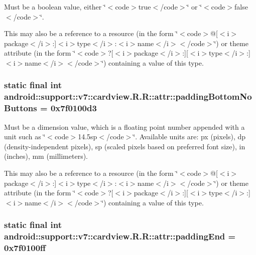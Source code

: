 Must be a boolean value, either \char`\"{}$<$code$>$true$<$/code$>$\char`\"{} or \char`\"{}$<$code$>$false$<$/code$>$\char`\"{}. 

This may also be a reference to a resource (in the form \char`\"{}$<$code$>$@\mbox{[}$<$i$>$package$<$/i$>$:\mbox{]}$<$i$>$type$<$/i$>$:$<$i$>$name$<$/i$>$$<$/code$>$\char`\"{}) or theme attribute (in the form \char`\"{}$<$code$>$?\mbox{[}$<$i$>$package$<$/i$>$:\mbox{]}\mbox{[}$<$i$>$type$<$/i$>$:\mbox{]}$<$i$>$name$<$/i$>$$<$/code$>$\char`\"{}) containing a value of this type. \hypertarget{classandroid_1_1support_1_1v7_1_1cardview_1_1_r_1_1attr_448e41b242eb37c2a11ed6d198179440}{
\subsubsection[{paddingBottomNoButtons}]{\setlength{\rightskip}{0pt plus 5cm}static final int android::support::v7::cardview.R.R::attr::paddingBottomNoButtons = 0x7f0100d3}}
\label{classandroid_1_1support_1_1v7_1_1cardview_1_1_r_1_1attr_448e41b242eb37c2a11ed6d198179440}


Must be a dimension value, which is a floating point number appended with a unit such as \char`\"{}$<$code$>$14.5sp$<$/code$>$\char`\"{}. Available units are: px (pixels), dp (density-independent pixels), sp (scaled pixels based on preferred font size), in (inches), mm (millimeters). 

This may also be a reference to a resource (in the form \char`\"{}$<$code$>$@\mbox{[}$<$i$>$package$<$/i$>$:\mbox{]}$<$i$>$type$<$/i$>$:$<$i$>$name$<$/i$>$$<$/code$>$\char`\"{}) or theme attribute (in the form \char`\"{}$<$code$>$?\mbox{[}$<$i$>$package$<$/i$>$:\mbox{]}\mbox{[}$<$i$>$type$<$/i$>$:\mbox{]}$<$i$>$name$<$/i$>$$<$/code$>$\char`\"{}) containing a value of this type. \hypertarget{classandroid_1_1support_1_1v7_1_1cardview_1_1_r_1_1attr_74874c3595db3e88b1ab94f9a50b3f54}{
\subsubsection[{paddingEnd}]{\setlength{\rightskip}{0pt plus 5cm}static final int android::support::v7::cardview.R.R::attr::paddingEnd = 0x7f0100ff}}
\label{classandroid_1_1support_1_1v7_1_1cardview_1_1_r_1_1attr_74874c3595db3e88b1ab94f9a50b3f54}


